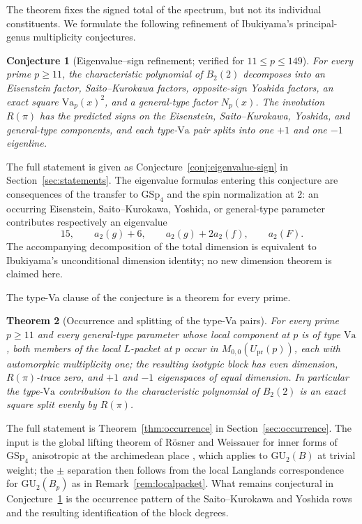 \documentclass[10pt,a4paper]{amsart}
\newtheorem{theorem}{Theorem}[section]
\newtheorem{conjecture}[theorem]{Conjecture}
\newcommand{\GU}{\mathrm{GU}}
\newcommand{\GSp}{\mathrm{GSp}}
\newcommand{\Upr}{U_{\mathrm{pr}}}
\newcommand{\Va}{\mathrm{Va}}
\providecommand{\Upr}{U_{\mathrm{pr}}}
\providecommand{\Va}{\mathrm{Va}}
\begin{document}
	The theorem fixes the signed total of the spectrum, but not its individual
	constituents. We formulate the following refinement of Ibukiyama's
	principal-genus multiplicity conjectures.
	
	\begin{conjecture}[Eigenvalue--sign refinement; verified for $11\le p\le149$]\label{conj:refined-intro}
		For every prime $p\ge11$, the characteristic polynomial of $B_2(2)$
		decomposes into an Eisenstein factor, Saito--Kurokawa factors,
		opposite-sign Yoshida factors, an exact square
		$\mathrm{Va}_p(x)^2$, and a general-type factor $N_p(x)$. The involution
		$R(\pi)$ has the predicted signs on the Eisenstein, Saito--Kurokawa,
		Yoshida, and general-type components, and each type-$\mathrm{Va}$ pair
		splits into one $+1$ and one $-1$ eigenline.
	\end{conjecture}
	The full statement is given as Conjecture~\ref{conj:eigenvalue-sign} in Section~\ref{sec:statements}. The eigenvalue formulas entering this conjecture are consequences of the transfer to $\GSp_4$ and the spin normalization at $2$: an occurring
	Eisenstein, Saito--Kurokawa, Yoshida, or general-type parameter contributes
	respectively an eigenvalue
	\[
	15,\qquad a_2(g)+6,\qquad a_2(g)+2a_2(f),\qquad a_2(F).
	\]
	The accompanying decomposition of the total dimension is equivalent to
	Ibukiyama's unconditional dimension identity; no new dimension theorem is
	claimed here.
	
	The type-Va clause of the conjecture is a theorem for every prime.
	
	\begin{theorem}[Occurrence and splitting of the type-Va pairs]\label{thm:occurrence-intro}
		For every prime $p\ge11$ and every general-type parameter whose local
		component at $p$ is of type $\Va$, both members of the local
		$L$-packet at $p$ occur in $M_{0,0}(\Upr(p))$, each with automorphic
		multiplicity one; the resulting isotypic block has even dimension,
		$R(\pi)$-trace zero, and $+1$ and $-1$ eigenspaces of equal
		dimension. In particular the type-$\Va$ contribution to the
		characteristic polynomial of $B_2(2)$ is an exact square split
		evenly by $R(\pi)$.
	\end{theorem}
	The full statement is Theorem~\ref{thm:occurrence} in
	Section~\ref{sec:occurrence}. The input is the global lifting theorem of
	R\"osner and Weissauer for inner forms of $\GSp_4$ anisotropic at the
	archimedean place \cite[Thm.~11.4]{RoesnerWeissauer2021}, which applies to
	$\GU_2(B)$ at trivial weight; the $\pm$ separation then follows from the
	local Langlands correspondence for $\GU_2(B_p)$ as in
	Remark~\ref{rem:localpacket}. What remains conjectural in
	Conjecture~\ref{conj:refined-intro} is the occurrence pattern of the
	Saito--Kurokawa and Yoshida rows and the resulting identification of the
	block degrees.
	
\end{document}
